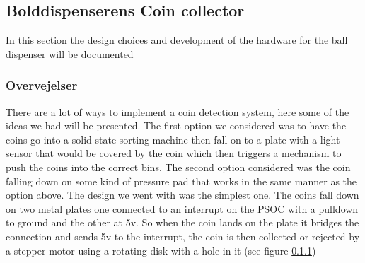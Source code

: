 \documentclass[HardwareDesign/HardwareDesign_main.tex]{subfiles}
\begin{document}
\subsection{Bolddispenserens Coin collector}\label{subsec:bolddispenserensCoinCollector}
In this section the design choices and development of the hardware for the ball dispenser will be documented
\subsubsection{Overvejelser}
There are a lot of ways to implement a coin detection system, here some of the ideas we had will be presented.
The first option we considered was to have the coins go into a solid state sorting machine then fall on to a plate with a light sensor that would be covered by the coin which then triggers a mechanism to push the coins into the correct bins.
The second option considered was the coin falling down on some kind of pressure pad that works in the same manner as the option above.
The design we went with was the simplest one.
The coins fall down on two metal plates one connected to an interrupt on the PSOC with a pulldown to ground and the other at 5v.
So when the coin lands on the plate it bridges the connection and sends 5v to the interrupt, the coin is then collected or rejected by a stepper motor using a rotating disk with a hole in it (see figure \ref{})
\end{document}
